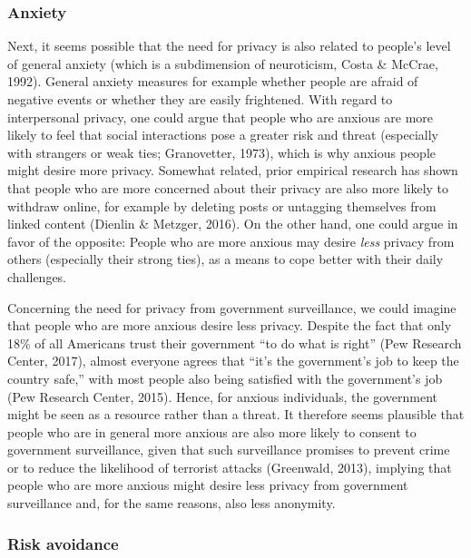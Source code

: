 \documentclass[man,floatsintext]{apa6}
\begin{document}
\hypertarget{anxiety}{%
\subsubsection{Anxiety}\label{anxiety}}

Next, it seems possible that the need for privacy is also related to people's level of general anxiety (which is a subdimension of neuroticism, Costa \& McCrae, 1992). General anxiety measures for example whether people are afraid of negative events or whether they are easily frightened. With regard to interpersonal privacy, one could argue that people who are anxious are more likely to feel that social interactions pose a greater risk and threat (especially with strangers or weak ties; Granovetter, 1973), which is why anxious people might desire more privacy. Somewhat related, prior empirical research has shown that people who are more concerned about their privacy are also more likely to withdraw online, for example by deleting posts or untagging themselves from linked content (Dienlin \& Metzger, 2016). On the other hand, one could argue in favor of the opposite: People who are more anxious may desire \emph{less} privacy from others (especially their strong ties), as a means to cope better with their daily challenges.

Concerning the need for privacy from government surveillance, we could imagine that people who are more anxious desire less privacy. Despite the fact that only 18\% of all Americans trust their government \enquote{to do what is right} (Pew Research Center, 2017), almost everyone agrees that \enquote{it's the government's job to keep the country safe,} with most people also being satisfied with the government's job (Pew Research Center, 2015). Hence, for anxious individuals, the government might be seen as a resource rather than a threat. It therefore seems plausible that people who are in general more anxious are also more likely to consent to government surveillance, given that such surveillance promises to prevent crime or to reduce the likelihood of terrorist attacks (Greenwald, 2013), implying that people who are more anxious might desire less privacy from government surveillance and, for the same reasons, also less anonymity.

\hypertarget{risk-avoidance}{%
\subsubsection{Risk avoidance}\label{risk-avoidance}}
\end{document}
